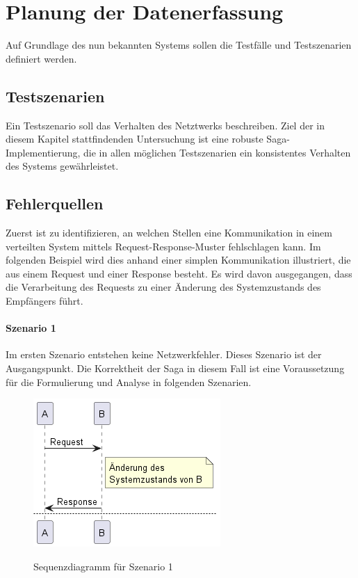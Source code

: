 \section{Planung der Datenerfassung}
Auf Grundlage des nun bekannten Systems sollen die Testfälle und Testszenarien definiert werden.

\subsection{Testszenarien}
Ein Testszenario soll das Verhalten des Netztwerks beschreiben. Ziel der in diesem Kapitel stattfindenden Untersuchung ist eine robuste Saga-Implementierung, die in allen möglichen Testszenarien ein konsistentes Verhalten des Systems gewährleistet. 

\subsection{Fehlerquellen}
Zuerst ist zu identifizieren, an welchen Stellen eine Kommunikation in einem verteilten System mittels Request-Response-Muster fehlschlagen kann. Im folgenden Beispiel wird dies anhand einer simplen Kommunikation illustriert, die aus einem Request und einer Response besteht. Es wird davon ausgegangen, dass die Verarbeitung des Requests zu einer Änderung des Systemzustands des Empfängers führt. 

\paragraph*{Szenario 1}
Im ersten Szenario entstehen keine Netzwerkfehler. Dieses Szenario ist der Ausgangspunkt. Die Korrektheit der Saga in diesem Fall ist eine Voraussetzung für die Formulierung und Analyse in folgenden Szenarien. 

\begin{figure}[H]
	\centering
	\includegraphics[width=.4\linewidth]{figures/ChapterVersuchsvorbereitung/TestSzenarien-0.png}
	\label{fig:Testszenario1}
	\caption{Sequenzdiagramm für Szenario 1}
\end{figure}
\FloatBarrier

